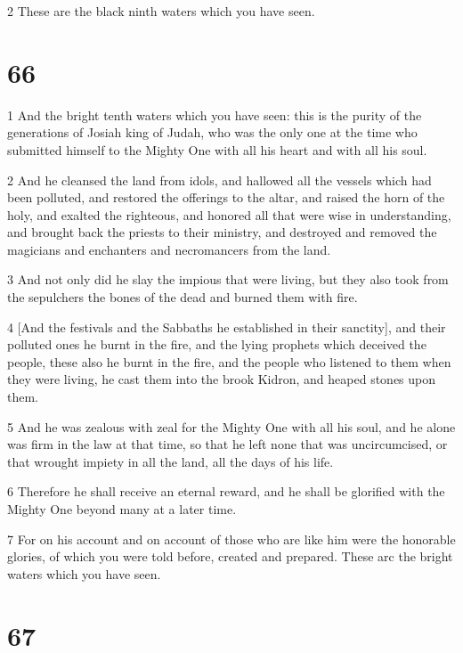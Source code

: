 \par 2 These are the black ninth waters which you have seen.

\chapter{66}

\par 1 And the bright tenth waters which you have seen: this is the purity of the generations of Josiah king of Judah, who was the only one at the time who submitted himself to the Mighty One with all his heart and with all his soul. 

\par 2 And he cleansed the land from idols, and hallowed all the vessels which had been polluted, and restored the offerings to the altar, and raised the horn of the holy, and exalted the righteous, and honored all that were wise in understanding, and brought back the priests to their ministry, and destroyed and removed the magicians and enchanters and necromancers from the land. 

\par 3 And not only did he slay the impious that were living, but they also took from the sepulchers the bones of the dead and burned them with fire. 

\par 4 [And the festivals and the Sabbaths he established in their sanctity], and their polluted ones he burnt in the fire, and the lying prophets which deceived the people, these also he burnt in the fire, and the people who listened to them when they were living, he cast them into the brook Kidron, and heaped stones upon them. 

\par 5 And he was zealous with zeal for the Mighty One with all his soul, and he alone was firm in the law at that time, so that he left none that was uncircumcised, or that wrought impiety in all the land, all the days of his life. 

\par 6 Therefore he shall receive an eternal reward, and he shall be glorified with the Mighty One beyond many at a later time. 

\par 7 For on his account and on account of those who are like him were the honorable glories, of which you were told before, created and prepared. These arc the bright waters which you have seen.

\chapter{67}

